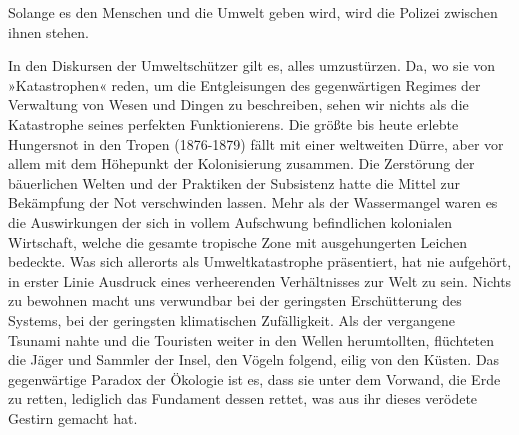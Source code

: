 Solange es den Menschen und die Umwelt geben wird, wird die Polizei
zwischen ihnen stehen.

\extrapar{}

In den Diskursen der Umweltschützer gilt es, alles umzustürzen. Da,
wo sie von »Katastrophen« reden, um die Entgleisungen des
gegenwärtigen Regimes der Verwaltung von Wesen und Dingen zu
beschreiben, sehen wir nichts als die Katastrophe seines perfekten
Funktionierens. Die größte bis heute erlebte Hungersnot in den
Tropen (1876-1879) fällt mit einer weltweiten Dürre, aber vor allem
mit dem Höhepunkt der Kolonisierung zusammen. Die Zerstörung der
bäuerlichen Welten und der Praktiken der Subsistenz hatte die
Mittel zur Bekämpfung der Not verschwinden lassen. Mehr als der
Wassermangel waren es die Auswirkungen der sich in vollem
Aufschwung befindlichen kolonialen Wirtschaft, welche die gesamte
tropische Zone mit ausgehungerten Leichen bedeckte. Was sich
allerorts als Umweltkatastrophe präsentiert, hat nie aufgehört, in
erster Linie Ausdruck eines verheerenden Verhältnisses zur Welt zu
sein. Nichts zu bewohnen macht uns verwundbar bei der geringsten
Erschütterung des Systems, bei der geringsten klimatischen
Zufälligkeit. Als der vergangene Tsunami nahte und die Touristen
weiter in den Wellen herumtollten, flüchteten die Jäger und Sammler
der Insel, den Vögeln folgend, eilig von den Küsten. Das
gegenwärtige Paradox der Ökologie ist es, dass sie unter dem
Vorwand, die Erde zu retten, lediglich das Fundament dessen rettet,
was aus ihr dieses verödete Gestirn gemacht hat.
\extrapar{}

